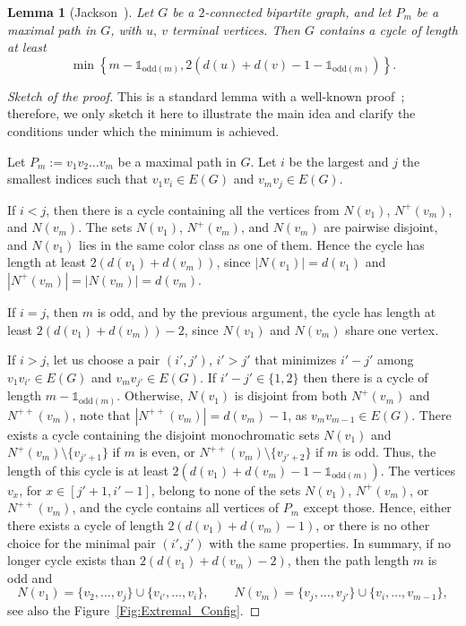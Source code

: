 \documentclass[11pt,a4paper]{article}
\newtheorem{lemma}[theorem]{Lemma}
\newcommand{\ind}[1]{\mathds{1}_{\text{odd}(#1)}}
\begin{document}
\begin{lemma}[Jackson~\cite{jackson1985long}]\label{Lemma_Jackson}
    Let $G$ be a $2$-connected bipartite graph, and let $P_m$ be a maximal path in $G$, with $u,~v$ terminal vertices.
    Then $G$ contains a cycle of length at least
  \[
  \min\left\{m-\ind{m},2\left(d(u)+d(v)-1-\ind{m}\right)\right\}.
  \]
\end{lemma}
\begin{proof}[Sketch of the proof]
This is a standard lemma with a well-known proof~\cite{jackson1985long}; therefore, we only sketch it here to illustrate the main idea and clarify the conditions under which the minimum is achieved.  

Let $P_m := v_1v_2 \dots v_m$ be a maximal path in $G$.  
Let $i$ be the largest and $j$ the smallest indices such that $v_1v_i \in E(G)$ and $v_m v_j \in E(G)$.


If $i < j$, then there is a cycle containing all the vertices from 
$N(v_1)$, $N^+(v_m)$, and $N(v_m)$.  
The sets $N(v_1)$, $N^+(v_m)$, and $N(v_m)$ are pairwise disjoint, and $N(v_1)$ lies in the same color class as one of them.  
Hence the cycle has length at least $2(d(v_1) + d(v_m))$, since 
$|N(v_1)| = d(v_1)$ and $|N^+(v_m)| = |N(v_m)| = d(v_m)$.  

If $i = j$, then $m$ is odd, and by the previous argument, the cycle has length at least 
$2(d(v_1) + d(v_m)) - 2$, since $N(v_1)$ and $N(v_m)$ share one vertex.


If $i > j$, let us choose a pair $(i', j')$, $i'>j'$ that minimizes $i' - j'$ among $v_1v_{i'} \in E(G)$ and $v_m v_{j'} \in E(G)$. 
If $i' - j'\in \{1,2\}$ then there is a cycle of length $m-\ind{m}$.  
Otherwise, $N(v_1)$ is disjoint from both $N^+(v_m)$ and $N^{++}(v_m)$, note that $|N^{++}(v_m)|=d(v_m)-1$, as $v_mv_{m-1}\in E(G)$.
There exists a cycle containing the disjoint monochromatic sets $N(v_1)$ and 
$N^{+}(v_m) \setminus \{v_{j'+1}\}$ if $m$ is even, or 
$N^{++}(v_m) \setminus \{v_{j'+2}\}$ if $m$ is odd.  
Thus, the length of this cycle is at least $2(d(v_1) + d(v_m) - 1-\ind{m})$.  
The vertices $v_x$, for $x \in [j'+1, i'-1]$, belong to none of the sets 
$N(v_1)$, $N^{+}(v_m)$, or $N^{++}(v_m)$, and the cycle contains all vertices of $P_m$ except those.  
Hence, either there exists a cycle of length $2(d(v_1) + d(v_m) - 1)$, or there is no other choice for the minimal pair $(i', j')$ with the same properties.  
In summary, if no longer cycle exists than $2(d(v_1) + d(v_m) - 2)$, then the path length $m$ is odd and
\[
N(v_1) = \{v_2, \dots, v_j\} \cup \{v_{i'}, \dots, v_i\},
\qquad
N(v_m) = \{v_j, \dots, v_{j'}\} \cup \{v_i, \dots, v_{m-1}\},
\]
see also the Figure~\ref{Fig:Extremal_Config}.



\end{proof}
\end{document}
